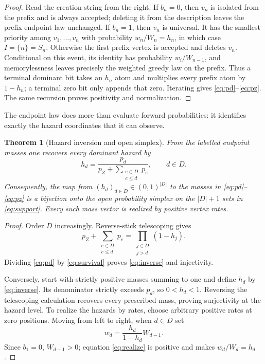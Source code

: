 \documentclass[10pt,a4paper]{amsart}
\newtheorem{theorem}{Theorem}[section]
\theoremstyle{remark}
\begin{document}
\begin{proof}
Read the creation string from the right.  If $b_n=0$, then $v_n$ is isolated
from the prefix and is always accepted; deleting it from the description
leaves the prefix endpoint law unchanged.  If $b_n=1$, then $v_n$ is universal.
It has the smallest priority among $v_1,\ldots,v_n$ with probability
$w_n/W_n=h_n$, in which case $I=\{n\}=S_n$.  Otherwise the first prefix vertex
is accepted and deletes $v_n$.  Conditional on this event, its identity has
probability $w_i/W_{n-1}$, and memorylessness leaves precisely the weighted
greedy law on the prefix.  Thus a terminal dominant bit takes an $h_n$ atom
and multiplies every prefix atom by $1-h_n$; a terminal zero bit only appends
that zero.  Iterating gives \eqref{eq:pd}--\eqref{eq:pz}.  The same recursion
proves positivity and normalization.
\end{proof}

The endpoint law does more than evaluate forward probabilities: it identifies
exactly the hazard coordinates that it can observe.

\begin{theorem}[Hazard inversion and open simplex]\label{thm:inverse}
From the labelled endpoint masses one recovers every dominant hazard by
\begin{equation}\label{eq:inverse}
 h_d=\frac{p_d}{p_Z+\displaystyle\sum_{\substack{e\in D\\e\leq d}}p_e},
 \qquad d\in D.
\end{equation}
Consequently, the map from $(h_d)_{d\in D}\in(0,1)^{|D|}$ to the masses in
\eqref{eq:pd}--\eqref{eq:pz} is a bijection onto the open probability simplex
on the $|D|+1$ sets in \eqref{eq:support}.  Every such mass vector is realized
by positive vertex rates.
\end{theorem}

\begin{proof}
Order $D$ increasingly.  Reverse-stick telescoping gives
\begin{equation}\label{eq:survival}
 p_Z+\sum_{\substack{e\in D\\e\leq d}}p_e
 =\prod_{\substack{j\in D\\j>d}}(1-h_j).
\end{equation}
Dividing \eqref{eq:pd} by \eqref{eq:survival} proves
\eqref{eq:inverse} and injectivity.

Conversely, start with strictly positive masses summing to one and define
$h_d$ by \eqref{eq:inverse}.  Its denominator strictly exceeds $p_d$, so
$0<h_d<1$.  Reversing the telescoping calculation recovers every prescribed
mass, proving surjectivity at the hazard level.  To realize the hazards by
rates, choose arbitrary positive rates at zero positions.  Moving from left
to right, when $d\in D$ set
\begin{equation}\label{eq:realize}
 w_d=\frac{h_d}{1-h_d}W_{d-1}.
\end{equation}
Since $b_1=0$, $W_{d-1}>0$; equation \eqref{eq:realize} is positive and makes
$w_d/W_d=h_d$.
\end{proof}
\end{document}
